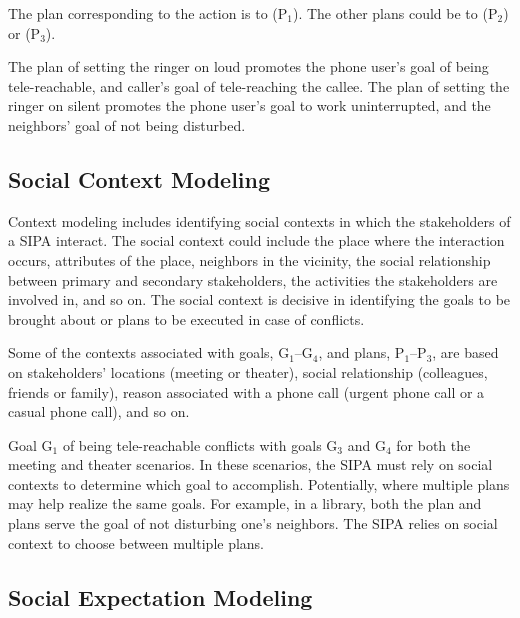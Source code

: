 \begin{description}[leftmargin=1em]
\item[Plans.] The plan corresponding to the  action is to
 (P$_1$). The other plans could be to
 (P$_2$) or  (P$_3$).

\item[Goal-plan association.] The plan of setting the ringer on
loud promotes the phone user's goal of being tele-reachable, and
caller's goal of tele-reaching the callee. The plan of setting the
ringer on silent promotes the phone user's goal to work
uninterrupted, and the neighbors' goal of not being disturbed.
\end{description}

\subsection{Social Context Modeling}

Context modeling includes identifying social contexts in which the
stakeholders of a SIPA interact. The social context could include the
place where the interaction occurs, attributes of the place, neighbors
in the vicinity, the social relationship between primary and secondary
stakeholders, the activities the stakeholders are involved in, and so
on. The social context is decisive in identifying the goals to be
brought about or plans to be executed in case of conflicts.

Some of the contexts associated with goals, G$_1$--G$_4$, and plans,
P$_1$--P$_3$, are based on stakeholders' locations (meeting or theater),
social relationship (colleagues, friends or family), reason
associated with a phone call (urgent phone call or a casual phone
call), and so on.

Goal G$_1$ of being tele-reachable conflicts with goals
G$_3$ and G$_4$ for both the meeting and theater scenarios.
In these scenarios, the SIPA must rely on social
contexts to determine which goal to accomplish. Potentially,
where multiple plans may help realize the same goals. For example, in a
library, both the  plan and 
plans serve the goal of not disturbing one's neighbors. The SIPA
relies on social context to choose between multiple plans. 
  
\subsection{Social Expectation Modeling}

